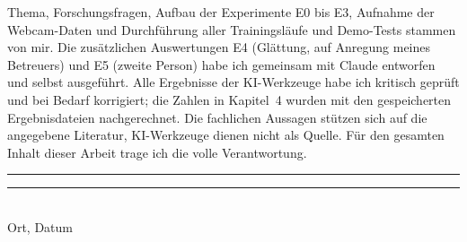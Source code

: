 Thema, Forschungsfragen, Aufbau der Experimente E0 bis E3, Aufnahme der
Webcam-Daten und Durchführung aller Trainingsläufe und Demo-Tests stammen von
mir. Die zusätzlichen Auswertungen E4 (Glättung, auf Anregung meines
Betreuers) und E5 (zweite Person) habe ich gemeinsam mit Claude entworfen und
selbst ausgeführt. Alle Ergebnisse der
KI-Werkzeuge habe ich kritisch geprüft und bei Bedarf korrigiert; die Zahlen
in Kapitel~4 wurden mit den gespeicherten Ergebnisdateien nachgerechnet. Die
fachlichen Aussagen stützen sich auf die angegebene Literatur, KI-Werkzeuge
dienen nicht als Quelle. Für den gesamten Inhalt dieser Arbeit trage ich die
volle Verantwortung.

\vspace{0.8cm}
\noindent\rule{6cm}{0.4pt}\hfill\rule{6cm}{0.4pt}\\
Ort, Datum \hfill \Autor
